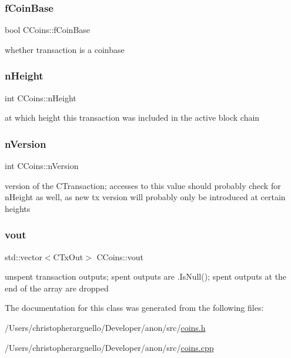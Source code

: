\subsubsection{\texorpdfstring{f\+Coin\+Base}{fCoinBase}}
{\footnotesize\ttfamily bool C\+Coins\+::f\+Coin\+Base}



whether transaction is a coinbase 

\mbox{\label{class_c_coins_af7396dfad71367de46f21cf92e2c70ab}} 
\subsubsection{\texorpdfstring{n\+Height}{nHeight}}
{\footnotesize\ttfamily int C\+Coins\+::n\+Height}



at which height this transaction was included in the active block chain 

\mbox{\label{class_c_coins_a96fea4ee8841e9ce32f60c2e7e3cf6b6}} 
\subsubsection{\texorpdfstring{n\+Version}{nVersion}}
{\footnotesize\ttfamily int C\+Coins\+::n\+Version}

version of the C\+Transaction; accesses to this value should probably check for n\+Height as well, as new tx version will probably only be introduced at certain heights \mbox{\label{class_c_coins_a1dcea1a6da9b25642337e286f9f59b03}} 
\subsubsection{\texorpdfstring{vout}{vout}}
{\footnotesize\ttfamily std\+::vector$<$C\+Tx\+Out$>$ C\+Coins\+::vout}



unspent transaction outputs; spent outputs are .Is\+Null(); spent outputs at the end of the array are dropped 



The documentation for this class was generated from the following files\+:\begin{DoxyCompactItemize}
\item 
/\+Users/christopherarguello/\+Developer/anon/src/\mbox{\hyperlink{coins_8h}{coins.\+h}}\item 
/\+Users/christopherarguello/\+Developer/anon/src/\mbox{\hyperlink{coins_8cpp}{coins.\+cpp}}\end{DoxyCompactItemize}
